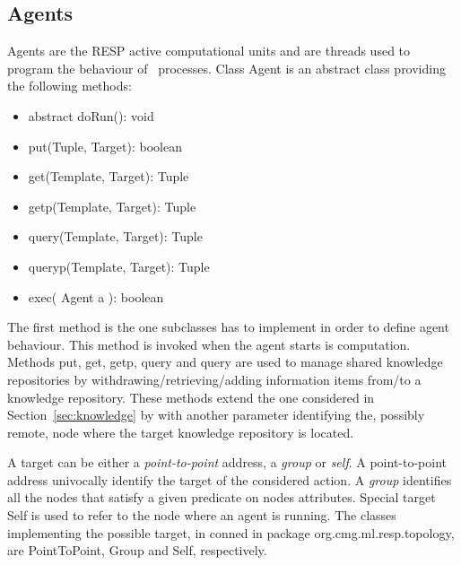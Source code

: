 \documentclass[11pt]{article}
\newcommand{\resp}{\textsf{RESP}}
\newcommand{\resppackage}[1]{\textsf{org.cmg.ml.resp.#1}}
\begin{document}
\subsection{Agents}
\label{sec:agents}

Agents are the \resp{} active computational units and are threads used to program the behaviour of 
\SCEL\  processes. Class \textsf{Agent} is an abstract class providing the following methods:
\begin{itemize}
\item \textsf{abstract doRun(): void}
\item \textsf{put(Tuple, Target): boolean}
\item \textsf{get(Template, Target): Tuple}
\item \textsf{getp(Template, Target): Tuple}
\item \textsf{query(Template, Target): Tuple}
\item \textsf{queryp(Template, Target): Tuple}
\item \textsf{exec( Agent a ): boolean}
\end{itemize}


The first method is the one subclasses has to implement in order to define agent behaviour. This method is invoked
when the agent starts is computation. 
%
Methods \textsf{put}, \textsf{get}, \textsf{getp}, \textsf{query} and \textsf{query} are used to manage shared knowledge 
repositories by withdrawing/retrieving/adding information items from/to a knowledge repository.
These methods extend the one considered in Section~\ref{sec:knowledge} by with another parameter
identifying the, possibly remote, node where the target knowledge repository is located.

A target can be either a \emph{point-to-point} address, a \emph{group} or \emph{self}. 
%
A point-to-point address univocally identify the target of the considered action.  A \emph{group} 
identifies all the nodes that satisfy a given predicate on nodes attributes. Special target \textsf{Self} 
is used to refer to the node where an agent is running.
%
The classes implementing the possible target, in conned in package \resppackage{topology}, are \textsf{PointToPoint}, \textsf{Group} and 
\textsf{Self}, respectively.
\end{document}
